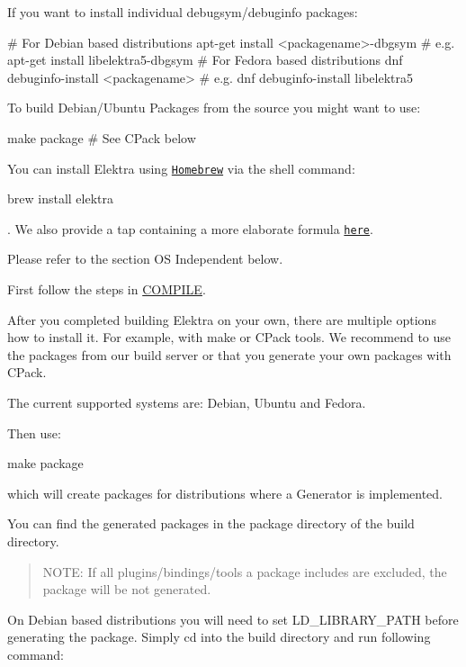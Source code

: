 If you want to install individual debugsym/debuginfo packages\+:


\begin{DoxyCode}
# For Debian based distributions
apt-get install <packagename>-dbgsym # e.g. apt-get install libelektra5-dbgsym
# For Fedora based distributions
dnf debuginfo-install <packagename> # e.g. dnf debuginfo-install libelektra5
\end{DoxyCode}


To build Debian/\+Ubuntu Packages from the source you might want to use\+:


\begin{DoxyCode}
make package # See CPack below
\end{DoxyCode}


You can install Elektra using \href{http://brew.sh}{\tt Homebrew} via the shell command\+:


\begin{DoxyCode}
brew install elektra
\end{DoxyCode}


. We also provide a tap containing a more elaborate formula \href{http://github.com/ElektraInitiative/homebrew-elektra}{\tt here}.

Please refer to the section OS Independent below.

First follow the steps in \hyperlink{doc_COMPILE_md}{C\+O\+M\+P\+I\+LE}.

After you completed building Elektra on your own, there are multiple options how to install it. For example, with make or C\+Pack tools. We recommend to use the packages from our build server or that you generate your own packages with C\+Pack.

The current supported systems are\+: Debian, Ubuntu and Fedora.

Then use\+:


\begin{DoxyCode}
make package
\end{DoxyCode}


which will create packages for distributions where a Generator is implemented.

You can find the generated packages in the {\ttfamily package} directory of the build directory.

\begin{quote}
N\+O\+TE\+: If all plugins/bindings/tools a package includes are excluded, the package will be not generated. \end{quote}


On Debian based distributions you will need to set L\+D\+\_\+\+L\+I\+B\+R\+A\+R\+Y\+\_\+\+P\+A\+TH before generating the package. Simply {\ttfamily cd} into the build directory and run following command\+:


